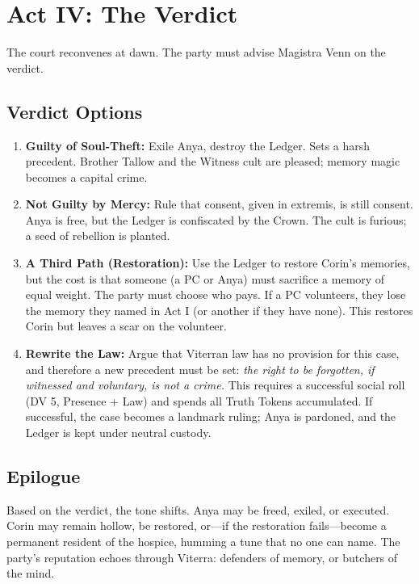 \documentclass[12pt]{book}
\begin{document}
\chapter{Act IV: The Verdict}

The court reconvenes at dawn. The party must advise Magistra Venn on the verdict.

\section{Verdict Options}

\begin{enumerate}
    \item \textbf{Guilty of Soul-Theft:} Exile Anya, destroy the Ledger. Sets a harsh precedent. Brother Tallow and the Witness cult are pleased; memory magic becomes a capital crime.
    \item \textbf{Not Guilty by Mercy:} Rule that consent, given in extremis, is still consent. Anya is free, but the Ledger is confiscated by the Crown. The cult is furious; a seed of rebellion is planted.
    \item \textbf{A Third Path (Restoration):} Use the Ledger to restore Corin's memories, but the cost is that someone (a PC or Anya) must sacrifice a memory of equal weight. The party must choose who pays. If a PC volunteers, they lose the memory they named in Act I (or another if they have none). This restores Corin but leaves a scar on the volunteer.
    \item \textbf{Rewrite the Law:} Argue that Viterran law has no provision for this case, and therefore a new precedent must be set: \textit{the right to be forgotten, if witnessed and voluntary, is not a crime.} This requires a successful social roll (DV 5, Presence + Law) and spends all Truth Tokens accumulated. If successful, the case becomes a landmark ruling; Anya is pardoned, and the Ledger is kept under neutral custody.
\end{enumerate}

\section{Epilogue}

Based on the verdict, the tone shifts. Anya may be freed, exiled, or executed. Corin may remain hollow, be restored, or---if the restoration fails---become a permanent resident of the hospice, humming a tune that no one can name. The party's reputation echoes through Viterra: defenders of memory, or butchers of the mind.
\end{document}
